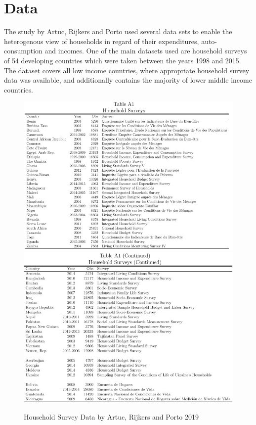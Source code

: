 \chapter{Data}

The study by Artuc, Rijkers and Porto used several data sets to enable the heterogenous view of households in regard of their
expenditures, auto-consumption and incomes.
One of the main datasets used are household surveys of 54 developing countries which were taken between the years 1998 and
2015. The dataset covers all low income countries, where appropriate household survey data was available, and additionally
contains the majority of lower middle income countries.
\begin{figure}[ht!]
    \centering
    \includegraphics*[scale=0.5]{graphics/householdsurvey1.jpg}
    \includegraphics*[scale=0.5]{graphics/householdsurvey2.jpg}
    \caption{Household Survey Data by Artuc, Rijkers and Porto 2019}
    \label{fig:household survey data}
\end{figure}\\

